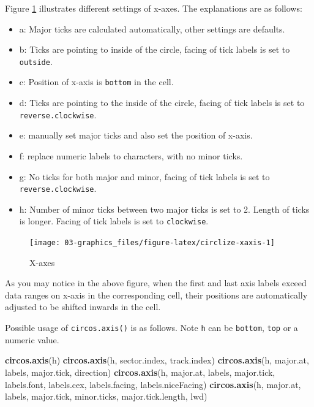 \documentclass[]{book}
\newenvironment{Shaded}{\begin{snugshade}}{\end{snugshade}}
\newcommand{\KeywordTok}[1]{\textcolor[rgb]{0.13,0.29,0.53}{\textbf{#1}}}
\newcommand{\NormalTok}[1]{#1}
\providecommand{\tightlist}{%
  \setlength{\itemsep}{0pt}\setlength{\parskip}{0pt}}
\theoremstyle{definition}
\theoremstyle{definition}
\theoremstyle{remark}
\begin{document}
Figure \ref{fig:circlize-xaxis} illustrates different settings of
x-axes. The explanations are as follows:

\begin{itemize}
\tightlist
\item
  a: Major ticks are calculated automatically, other settings are
  defaults.
\item
  b: Ticks are pointing to inside of the circle, facing of tick labels
  is set to \texttt{outside}.
\item
  c: Position of x-axis is \texttt{bottom} in the cell.
\item
  d: Ticks are pointing to the inside of the circle, facing of tick
  labels is set to \texttt{reverse.clockwise}.
\item
  e: manually set major ticks and also set the position of x-axis.
\item
  f: replace numeric labels to characters, with no minor ticks.
\item
  g: No ticks for both major and minor, facing of tick labels is set to
  \texttt{reverse.clockwise}.
\item
  h: Number of minor ticks between two major ticks is set to 2. Length
  of ticks is longer. Facing of tick labels is set to
  \texttt{clockwise}.
\end{itemize}

\begin{figure}

{\centering \texttt{[image: 03-graphics\_files/figure-latex/circlize-xaxis-1]} 

}

\caption{X-axes}\label{fig:circlize-xaxis}
\end{figure}

As you may notice in the above figure, when the first and last axis
labels exceed data ranges on x-axis in the corresponding cell, their
positions are automatically adjusted to be shifted inwards in the cell.

Possible usage of \texttt{circos.axis()} is as follows. Note \texttt{h}
can be \texttt{bottom}, \texttt{top} or a numeric value.

\begin{Shaded}
\begin{Highlighting}[]
\KeywordTok{circos.axis}\NormalTok{(h)}
\KeywordTok{circos.axis}\NormalTok{(h, sector.index, track.index)}
\KeywordTok{circos.axis}\NormalTok{(h, major.at, labels, major.tick, direction)}
\KeywordTok{circos.axis}\NormalTok{(h, major.at, labels, major.tick, labels.font, labels.cex,}
\NormalTok{            labels.facing, labels.niceFacing)}
\KeywordTok{circos.axis}\NormalTok{(h, major.at, labels, major.tick, minor.ticks,}
\NormalTok{            major.tick.length, lwd)}
\end{Highlighting}
\end{Shaded}
\end{document}
